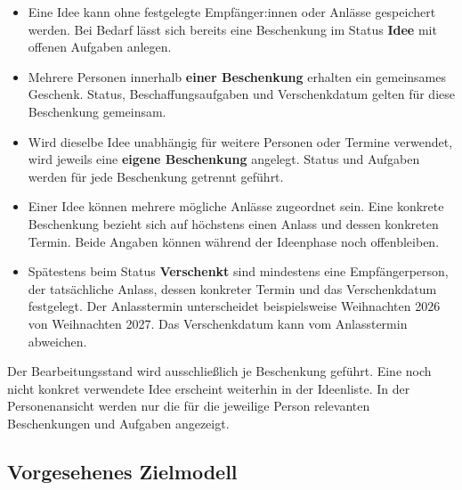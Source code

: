 \documentclass[11pt,a4paper]{article}
\begin{document}
\begin{itemize}
\item Eine Idee kann ohne festgelegte Empfänger:innen oder Anlässe gespeichert werden. Bei Bedarf lässt sich bereits eine Beschenkung im Status \textbf{Idee} mit offenen Aufgaben anlegen.
\item Mehrere Personen innerhalb \textbf{einer Beschenkung} erhalten ein gemeinsames Geschenk. Status, Beschaffungsaufgaben und Verschenkdatum gelten für diese Beschenkung gemeinsam.
\item Wird dieselbe Idee unabhängig für weitere Personen oder Termine verwendet, wird jeweils eine \textbf{eigene Beschenkung} angelegt. Status und Aufgaben werden für jede Beschenkung getrennt geführt.
\item Einer Idee können mehrere mögliche Anlässe zugeordnet sein. Eine konkrete Beschenkung bezieht sich auf höchstens einen Anlass und dessen konkreten Termin. Beide Angaben können während der Ideenphase noch offenbleiben.
\item Spätestens beim Status \textbf{Verschenkt} sind mindestens eine Empfängerperson, der tatsächliche Anlass, dessen konkreter Termin und das Verschenkdatum festgelegt. Der Anlasstermin unterscheidet beispielsweise Weihnachten 2026 von Weihnachten 2027. Das Verschenkdatum kann vom Anlasstermin abweichen.
\end{itemize}

Der Bearbeitungsstand wird ausschließlich je Beschenkung geführt. Eine noch nicht konkret verwendete Idee erscheint weiterhin in der Ideenliste. In der Personenansicht werden nur die für die jeweilige Person relevanten Beschenkungen und Aufgaben angezeigt.

\subsection{Vorgesehenes Zielmodell}
\end{document}
